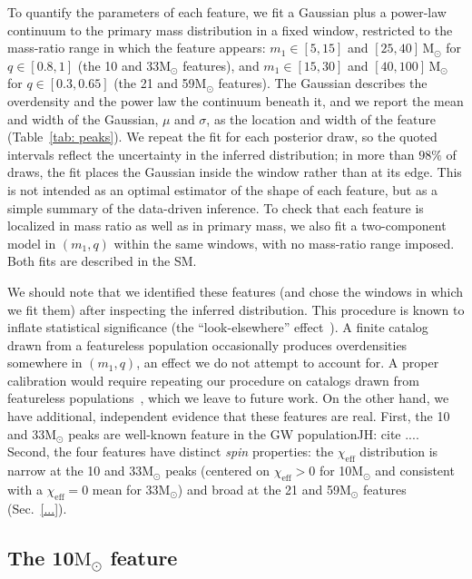 \documentclass[%
 reprint,
 amsmath,amssymb,
 aps,
 prl,
 nofootinbib,nobibnotes,
]{revtex4-2}
\newcommand{\Msun}{\ensuremath{\mathrm{M}_{\odot}}}
\newcommand{\chieff}{\ensuremath{\chi_{\mathrm{eff}}}}
\newcommand{\todo}[1]{{\color{Blue}\bf TODO: #1}}
\newcommand{\jh}[1]{{\color{orange}JH: #1}}
\newcommand{\featTen}{10\xspace}
\newcommand{\featTwenty}{21\xspace}
\newcommand{\featThirtyFive}{33\xspace}
\newcommand{\featSixty}{59\xspace}
\begin{document}
To quantify the parameters of each feature, we fit a Gaussian plus a power-law continuum to the primary mass distribution in a fixed window, restricted to the mass-ratio range in which the feature appears: $m_1 \in [5, 15]$ and $[25, 40]\,\Msun$ for $q \in [0.8, 1]$ (the \featTen and \featThirtyFive $\Msun$ features), and $m_1 \in [15, 30]$ and $[40, 100]\,\Msun$ for $q \in [0.3, 0.65]$ (the \featTwenty and \featSixty $\Msun$ features). The Gaussian describes the overdensity and the power law the continuum beneath it, and we report the mean and width of the Gaussian, $\mu$ and $\sigma$, as the location and width of the feature (Table~\ref{tab: peaks}). We repeat the fit for each posterior draw, so the quoted intervals reflect the uncertainty in the inferred distribution; in more than $98\%$ of draws, the fit places the Gaussian inside the window rather than at its edge. This is not intended as an optimal estimator of the shape of each feature, but as a simple summary of the data-driven inference. To check that each feature is localized in mass ratio as well as in primary mass, we also fit a two-component model in $(m_1, q)$ within the same windows, with no mass-ratio range imposed. Both fits are described in the SM.

We should note that we identified these features (and chose the windows in which we fit them) after inspecting the inferred distribution. This procedure is known to inflate statistical significance (the ``look-elsewhere'' effect~\cite{Gross:2010qma}).  A finite catalog drawn from a featureless population occasionally produces overdensities somewhere in $(m_1, q)$, an effect we do not attempt to account for. A proper calibration would require repeating our procedure on catalogs drawn from featureless populations~\cite[e.g.,][]{Farah:2023vsc}, which we leave to future work. On the other hand, we have additional, independent evidence that these features are real. First, the \featTen and \featThirtyFive $\Msun$ peaks are well-known feature in the \ac{GW} population\jh{cite ...}. Second, the four features have distinct \textit{spin} properties: the $\chieff$ distribution is narrow at the \featTen and \featThirtyFive $\Msun$ peaks (centered on $\chieff > 0$ for \featTen $\Msun$ and consistent with a $\chieff =0$ mean for \featThirtyFive $\Msun$)  and broad at the \featTwenty and \featSixty $\Msun$ features (Sec.~\ref{...}).


\subsection{The \featTen $\Msun$ feature}
\end{document}
